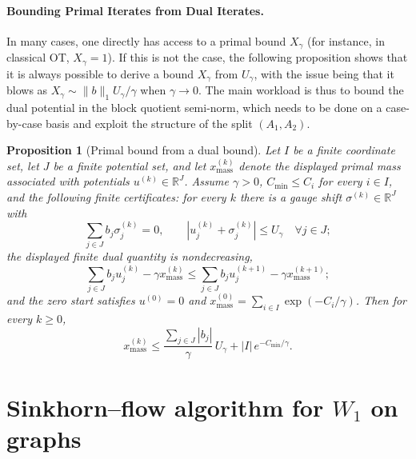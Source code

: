 \documentclass{article}
\theoremstyle{plain}
\newtheorem{proposition}{Proposition}[section]
\newcommand{\RR}{\mathbb{R}}
\newcommand{\Umax}{U_\gamma}
\newcommand{\Xmax}{X_\gamma}
\begin{document}
\paragraph{Bounding Primal Iterates from Dual Iterates.}
\label{sec:bounding-primal-dual}

In many cases, one directly has access to a primal bound $\Xmax$ (for instance, in classical OT, $\Xmax=1$). If this is not the case, the following proposition shows that it is always possible to derive a bound $\Xmax$ from $\Umax$, with the issue being that it blows as $\Xmax \sim \|b\|_1 \Umax/\gamma$ when  $\gamma\to 0$.
%
The main workload is thus to bound the dual potential in the block quotient semi-norm, which needs to be done on a case-by-case basis and exploit the structure of the split $(A_1,A_2)$. 


\begin{proposition}[Primal bound from a dual bound]\label{prop:mass-bound-block}
Let $I$ be a finite coordinate set, let $J$ be a finite potential set, and let $x_{\mathrm{mass}}^{(k)}$ denote the displayed primal mass associated with potentials $u^{(k)}\in\RR^J$.
Assume $\gamma>0$, $C_{\min}\le C_i$ for every $i\in I$, and the following finite certificates:
for every $k$ there is a gauge shift $\sigma^{(k)}\in\RR^J$ with
\[
  \sum_{j\in J} b_j\sigma_j^{(k)}=0,
  \qquad
  |u_j^{(k)}+\sigma_j^{(k)}|\le \Umax\quad\forall j\in J;
\]
the displayed finite dual quantity is nondecreasing,
\[
  \sum_{j\in J}b_j u_j^{(k)}-\gamma x_{\mathrm{mass}}^{(k)}
  \le
  \sum_{j\in J}b_j u_j^{(k+1)}-\gamma x_{\mathrm{mass}}^{(k+1)};
\]
and the zero start satisfies $u^{(0)}=0$ and
$x_{\mathrm{mass}}^{(0)}=\sum_{i\in I}\exp(-C_i/\gamma)$.
Then for every $k\ge0$,
\[
  x_{\mathrm{mass}}^{(k)}
  \le
  \frac{\sum_{j\in J}|b_j|}{\gamma}\,\Umax
  +
  |I|\,e^{-C_{\min}/\gamma}.
\]
\end{proposition}



\newcommand{\Geod}{D} %
\newcommand{\Flows}{\mathbb{F}} %

\section{Sinkhorn--flow algorithm for \texorpdfstring{$W_1$}{W1} on graphs}
\label{sec:applications}
\end{document}
